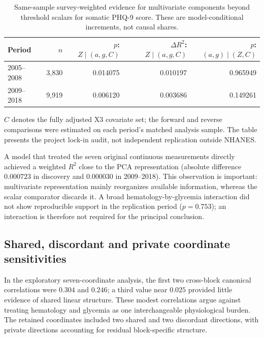 \documentclass[11pt,a4paper]{article}
\newcommand{\Rtwo}{R^{2}}
\begin{document}
\begin{table}[htbp]\centering\small
\caption{Same-sample survey-weighted evidence for multivariate components beyond threshold scalars for somatic PHQ-9 score. These are model-conditional increments, not causal shares.}
\label{tab:increment}
\begin{tabular}{lrrrr}\toprule
Period & $n$ & $p$: $Z\mid(a,g,C)$ & $\Delta\Rtwo$: $Z\mid(a,g,C)$ & $p$: $(a,g)\mid(Z,C)$\\\midrule
2005--2008 & 3,830 & 0.014075 & 0.010197 & 0.965949\\
2009--2018 & 9,919 & 0.006120 & 0.003686 & 0.149261\\\bottomrule
\end{tabular}\par\vspace{2pt}
\begin{minipage}{0.97\linewidth}\footnotesize $C$ denotes the fully adjusted X3 covariate set; the forward and reverse comparisons were estimated on each period's matched analysis sample. The table presents the project lock-in audit, not independent replication outside NHANES.\end{minipage}
\end{table}

A model that treated the seven original continuous measurements directly achieved a weighted $\Rtwo$ close to the PCA representation (absolute difference $0.000723$ in discovery and $0.000030$ in 2009--2018). This observation is important: multivariate representation mainly reorganizes available information, whereas the scalar comparator discards it. A broad hematology-by-glycemia interaction did not show reproducible support in the replication period ($p=0.753$); an interaction is therefore not required for the principal conclusion.

\subsection{Shared, discordant and private coordinate sensitivities}
In the exploratory seven-coordinate analysis, the first two cross-block canonical correlations were $0.304$ and $0.246$; a third value near $0.025$ provided little evidence of shared linear structure. These modest correlations argue against treating hematology and glycemia as one interchangeable physiological burden. The retained coordinates included two shared and two discordant directions, with private directions accounting for residual block-specific structure.
\end{document}
